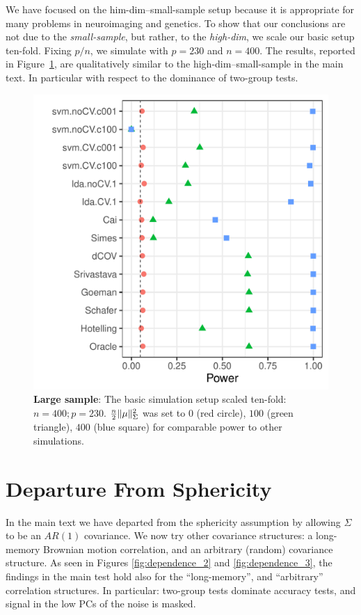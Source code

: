 \documentclass[oupdraft]{bio}
\begin{document}
We have focused on the him-dim--small-sample setup because it is appropriate for many problems in neuroimaging and genetics. 
To show that our conclusions are not due to the \emph{small-sample}, but rather, to the \emph{high-dim}, we scale our basic setup ten-fold. 
Fixing $p/n$, we simulate with $p=230$ and $n=400$. 
The results, reported in Figure~\ref{fig:large-sample}, are qualitatively similar to the high-dim--small-sample in the main text.
In particular with respect to the dominance of two-group tests. 
\begin{figure}[h]
	\centering
	\includegraphics[width=0.45\columnwidth]{"file1"}
	\caption{\textbf{Large sample}: The basic simulation setup scaled ten-fold: $n=400; p=230$.
	$\frac{n}{2}\Vert \mu \Vert^2_\Sigma$ was set to $0$ (red circle), $100$ (green triangle), $400$ (blue square) for comparable power to other simulations.}
	\label{fig:large-sample}
\end{figure}





\section{Departure From Sphericity}
In the main text we have departed from the sphericity assumption by allowing $\Sigma$ to be an $AR(1)$ covariance. 
We now try other covariance structures: a long-memory Brownian motion correlation, and an arbitrary (random) covariance structure. 
As seen in Figures \ref{fig:dependence_2} and \ref{fig:dependence_3}, the findings in the main test hold also for the ``long-memory'', and ``arbitrary'' correlation structures.
In particular: two-group tests dominate accuracy tests, and signal in the low PCs of the noise is masked. 
\end{document}
